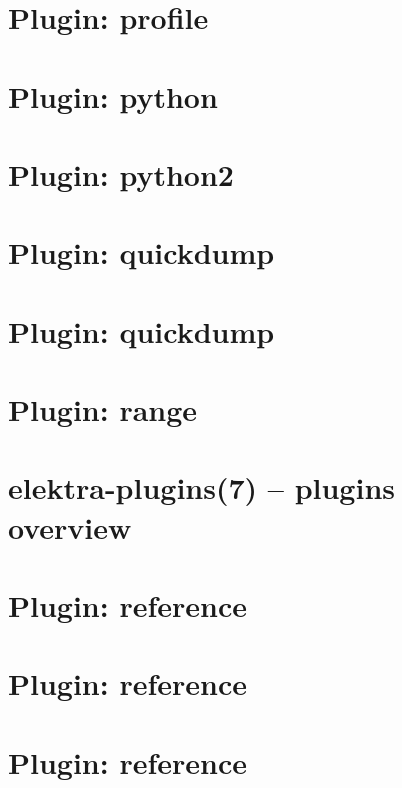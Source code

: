 \let\mypdfximage\pdfximage\def\pdfximage{\immediate\mypdfximage}\documentclass[twoside]{book}
\newcommand{\+}{\discretionary{\mbox{\scriptsize$\hookleftarrow$}}{}{}}
\begin{document}
\chapter{Plugin\+: profile}
\label{autotoc_md536}

\chapter{Plugin\+: python}
\label{autotoc_md538}

\chapter{Plugin\+: python2}
\label{autotoc_md544}

\chapter{Plugin\+: quickdump}
\label{autotoc_md545}

\chapter{Plugin\+: quickdump}
\label{autotoc_md561}

\chapter{Plugin\+: range}
\label{autotoc_md571}

\chapter{elektra-\/plugins(7) -- plugins overview}
\label{src_plugins_README_md}

\chapter{Plugin\+: reference}
\label{autotoc_md593}

\chapter{Plugin\+: reference}
\label{autotoc_md594}

\chapter{Plugin\+: reference}
\label{autotoc_md596}

\end{document}
